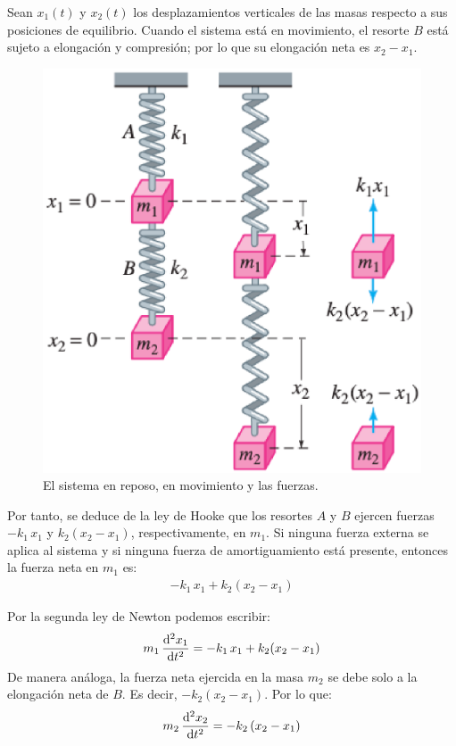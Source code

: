 Sean $x_{1}(t)$ y $x_{2}(t)$ los desplazamientos verticales de las masas respecto a sus posiciones de equilibrio. Cuando el sistema está en movimiento, el resorte $B$ está sujeto a elongación y compresión;
por lo que su elongación neta es $x_{2} - x_{1}$.

\begin{figure}[H]
    \centering
    \includegraphics[scale=0.6]{Imagenes/Ejercicio_Dos_Masas_02.eps}
    \caption{El sistema en reposo, en movimiento y las fuerzas.}
    \label{fig:figura_dos_masas_02}
\end{figure}

Por tanto, se deduce de la ley de Hooke que los resortes $A$ y $B$ ejercen fuerzas $-k_{1} \, x_{1}$ y $k_{2} (x_{2} - x_{1})$, respectivamente, en $m_{1}$. Si ninguna fuerza externa se aplica al sistema y si ninguna fuerza de amortiguamiento está presente, entonces la fuerza neta en $m_{1}$ es:
\begin{align*}
-k_{1} \, x_{1} + k_{2} (x_{2} - x_{1})
\end{align*}



Por la segunda ley de Newton podemos escribir:
\begin{align*}
m_{1} \, \dv[2]{x_{1}}{t} = - k_{1} \, x_{1} + k_{2} (x_{2} - x_{1})
\end{align*}
De manera análoga, la fuerza neta ejercida en la masa $m_{2}$ se debe solo a la elongación neta de $B$. Es decir, $-k_{2} (x_{2} - x_{1})$. Por lo que:
\begin{align*}
m_{2} \, \dv[2]{x_{2}}{t} = - k_{2} \, (x_{2} - x_{1})
\end{align*}

